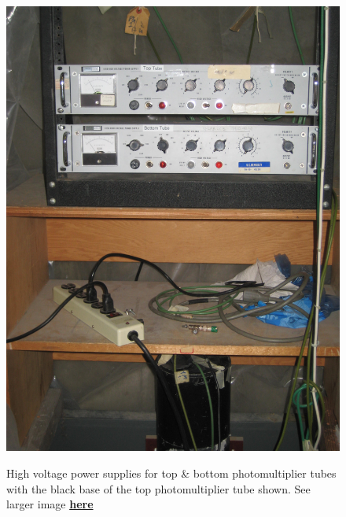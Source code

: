 \documentclass{../lab}
\begin{document}
\begin{figure}[h]
\begin{minipage}{0.18\textwidth}
    \href{http://experimentationlab.berkeley.edu/sites/default/files/images/MUO_Pwr_3562.jpg}{\includegraphics[width=\linewidth,keepaspectratio]{images/MUO_Pwr_3562.jpg}}
    \caption{High voltage power supplies for top \& bottom photomultiplier tubes with the black base of the top photomultiplier tube shown. See larger image \href{http://experimentationlab.berkeley.edu/sites/default/files/images/MUO_Pwr_3562.jpg}{\textbf{here}}}
\end{minipage}
\begin{minipage}{0.20\textwidth}

\end{minipage}
\end{figure}
\end{document}
